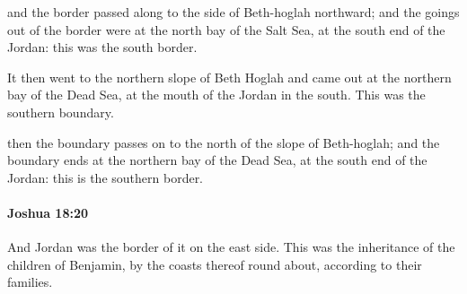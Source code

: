 			\begin{versebox}
					\item[BHS] 
					\item[ASV] and the border passed along to the side of Beth-hoglah northward; and the goings out of the border were at the north bay of the Salt Sea, at the south end of the Jordan: this was the south border.
					\item[NIV] It then went to the northern slope of Beth Hoglah and came out at the northern bay of the Dead Sea, at the mouth of the Jordan in the south. This was the southern boundary.
					\item[NRSV] then the boundary passes on to the north of the slope of Beth-hoglah; and the boundary ends at the northern bay of the Dead Sea, at the south end of the Jordan: this is the southern border.
			\end{versebox}

		\paragraph{Joshua 18:20} %
			\label{JOSHUA-18-20}

			And Jordan was the border of it on the east side. This was the inheritance of the children of Benjamin, by the coasts thereof round about, according to their families.

